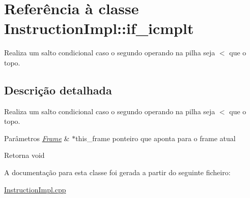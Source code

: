 \hypertarget{class_instruction_impl_1_1if__icmplt}{}\section{Referência à classe Instruction\+Impl\+:\+:if\+\_\+icmplt}
\label{class_instruction_impl_1_1if__icmplt}


Realiza um salto condicional caso o segundo operando na pilha seja $<$ que o topo.  




\subsection{Descrição detalhada}
Realiza um salto condicional caso o segundo operando na pilha seja $<$ que o topo. 


\begin{DoxyParams}{Parâmetros}
{\em \hyperlink{struct_frame}{Frame}} & $\ast$this\+\_\+frame ponteiro que aponta para o frame atual \\
\hline
\end{DoxyParams}
\begin{DoxyReturn}{Retorna}
void 
\end{DoxyReturn}


A documentação para esta classe foi gerada a partir do seguinte ficheiro\+:\begin{DoxyCompactItemize}
\item 
\hyperlink{_instruction_impl_8cpp}{Instruction\+Impl.\+cpp}\end{DoxyCompactItemize}
